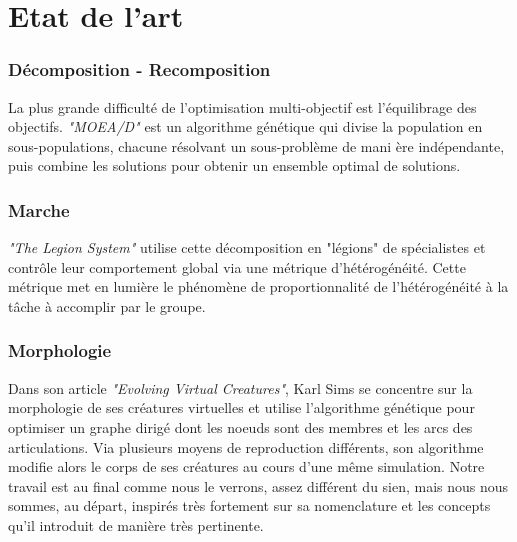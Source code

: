 \documentclass[journal, a4paper]{IEEEtran}
\begin{document}

\section{Etat de l'art}\label{sec:etat-de-l'art}
	\subsubsection{Décomposition - Recomposition}
	La plus grande difficulté de l'optimisation multi-objectif est
	l'équilibrage des objectifs.
	\textit{"MOEA/D"}\cite{MOEA/D} est un algorithme génétique qui divise la
	population en
	sous-populations, chacune résolvant un sous-problème de mani
	ère indépendante,
	puis combine les solutions pour obtenir un ensemble optimal de solutions.

	\subsubsection{Marche}
	\textit{"The Legion System"}\cite{Josh-C-Bongard} utilise cette
	décomposition
	en "légions" de spécialistes et contrôle leur comportement global
	via une métrique d'hétérogénéité. Cette métrique met en lumière
	le phénomène de proportionnalité de l'hétérogénéité à la tâche
	à accomplir par le groupe.

	\subsubsection{Morphologie}
	Dans son article \textit{"Evolving Virtual Creatures"}\cite{Sims},
	Karl Sims se concentre sur la morphologie de ses créatures
	virtuelles et utilise
	l'algorithme	génétique pour optimiser un graphe dirigé dont
	les noeuds sont des membres et les arcs des articulations.
	Via plusieurs moyens de reproduction différents, son algorithme
	modifie alors le corps de ses créatures au cours d'une même
	simulation.
	Notre travail est au final comme nous le verrons, assez différent
	du sien, mais nous nous sommes, au départ, inspirés très fortement
	sur	sa
	nomenclature et les concepts qu'il introduit de manière très
	pertinente.
\end{document}
